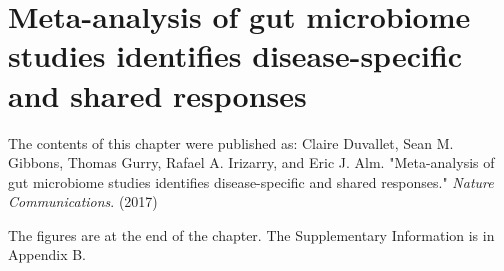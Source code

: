 
\chapter{Meta-analysis of gut microbiome studies identifies disease-specific and shared responses}

The contents of this chapter were published as:
Claire Duvallet, Sean M. Gibbons, Thomas Gurry, Rafael A. Irizarry, and Eric J. Alm. "Meta-analysis of gut microbiome studies identifies disease-specific and shared responses." \textit{Nature Communications}. (2017)

The figures are at the end of the chapter. The Supplementary Information is in Appendix B.

%
